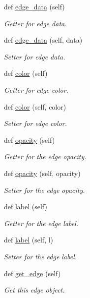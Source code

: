 \begin{DoxyCompactItemize}
def \hyperlink{classbridges_1_1edge_1_1_edge_abc3f52467d38ad2d7e06113d0c714ed6}{edge\+\_\+data} (self)
\begin{DoxyCompactList}\small\item\em Getter for edge data. \end{DoxyCompactList}\item 
def \hyperlink{classbridges_1_1edge_1_1_edge_a7429980b52d754159629c73c316cbc41}{edge\+\_\+data} (self, data)
\begin{DoxyCompactList}\small\item\em Setter for edge data. \end{DoxyCompactList}\item 
def \hyperlink{classbridges_1_1edge_1_1_edge_a24a4845aeae4ca6fc432b6d0b7fa78c2}{color} (self)
\begin{DoxyCompactList}\small\item\em Getter for edge color. \end{DoxyCompactList}\item 
def \hyperlink{classbridges_1_1edge_1_1_edge_a81ccb5ffd5838829e1a2217846c4df77}{color} (self, color)
\begin{DoxyCompactList}\small\item\em Setter for edge color. \end{DoxyCompactList}\item 
def \hyperlink{classbridges_1_1edge_1_1_edge_ab65d08382b8773d4051e2a1161db8ca6}{opacity} (self)
\begin{DoxyCompactList}\small\item\em Getter for the edge opacity. \end{DoxyCompactList}\item 
def \hyperlink{classbridges_1_1edge_1_1_edge_aa2dca1c00c4d2ec377cdb0dd8eefd93d}{opacity} (self, opacity)
\begin{DoxyCompactList}\small\item\em Setter for the edge opacity. \end{DoxyCompactList}\item 
def \hyperlink{classbridges_1_1edge_1_1_edge_a3a2e3ddaeb54695f9e076eb89a8108fd}{label} (self)
\begin{DoxyCompactList}\small\item\em Getter for the edge label. \end{DoxyCompactList}\item 
def \hyperlink{classbridges_1_1edge_1_1_edge_a16327b62c38de382f24a4e3a06bd5648}{label} (self, l)
\begin{DoxyCompactList}\small\item\em Setter for the edge label. \end{DoxyCompactList}\item 
def \hyperlink{classbridges_1_1edge_1_1_edge_a406b906ea8e177a6e54f6c794c04df3d}{get\+\_\+edge} (self)
\begin{DoxyCompactList}\small\item\em Get this edge object. \end{DoxyCompactList}\end{DoxyCompactItemize}
